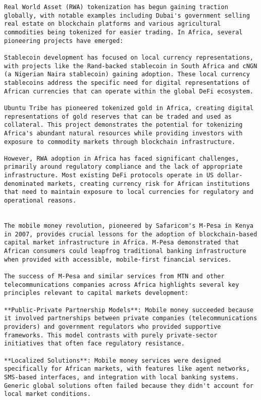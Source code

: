 \documentclass[12pt]{article}
\begin{document}
{{{\begin{itemize}
\begin{lstlisting}
Real World Asset (RWA) tokenization has begun gaining traction globally, with notable examples including Dubai's government selling real estate on blockchain platforms and various agricultural commodities being tokenized for easier trading. In Africa, several pioneering projects have emerged:

Stablecoin development has focused on local currency representations, with projects like the Rand-backed stablecoin in South Africa and cNGN (a Nigerian Naira stablecoin) gaining adoption. These local currency stablecoins address the specific need for digital representations of African currencies that can operate within the global DeFi ecosystem.

Ubuntu Tribe has pioneered tokenized gold in Africa, creating digital representations of gold reserves that can be traded and used as collateral. This project demonstrates the potential for tokenizing Africa's abundant natural resources while providing investors with exposure to commodity markets through blockchain infrastructure.

However, RWA adoption in Africa has faced significant challenges, primarily around regulatory compliance and the lack of appropriate infrastructure. Most existing DeFi protocols operate in US dollar-denominated markets, creating currency risk for African institutions that need to maintain exposure to local currencies for regulatory and operational reasons.


The mobile money revolution, pioneered by Safaricom's M-Pesa in Kenya in 2007, provides crucial lessons for the adoption of blockchain-based capital market infrastructure in Africa. M-Pesa demonstrated that African consumers could leapfrog traditional banking infrastructure when provided with accessible, mobile-first financial services.

The success of M-Pesa and similar services from MTN and other telecommunications companies across Africa highlights several key principles relevant to capital markets development:

**Public-Private Partnership Models**: Mobile money succeeded because it involved partnerships between private companies (telecommunications providers) and government regulators who provided supportive frameworks. This model contrasts with purely private-sector initiatives that often face regulatory resistance.

**Localized Solutions**: Mobile money services were designed specifically for African markets, with features like agent networks, SMS-based interfaces, and integration with local banking systems. Generic global solutions often failed because they didn't account for local market conditions.


\end{lstlisting}
\end{itemize}}}}
\end{document}
